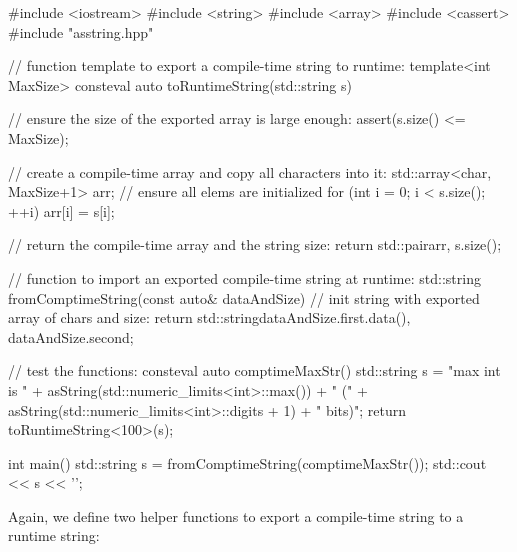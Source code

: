 \begin{cpp}
#include <iostream>
#include <string>
#include <array>
#include <cassert>
#include "asstring.hpp"

// function template to export a compile-time string to runtime:
template<int MaxSize>
consteval auto toRuntimeString(std::string s)
{
	// ensure the size of the exported array is large enough:
	assert(s.size() <= MaxSize);
	
	// create a compile-time array and copy all characters into it:
	std::array<char, MaxSize+1> arr{}; // ensure all elems are initialized
	for (int i = 0; i < s.size(); ++i) {
		arr[i] = s[i];
	}
	
	// return the compile-time array and the string size:
	return std::pair{arr, s.size()};
}

// function to import an exported compile-time string at runtime:
std::string fromComptimeString(const auto& dataAndSize)
{
	// init string with exported array of chars and size:
	return std::string{dataAndSize.first.data(),
					   dataAndSize.second};
}

// test the functions:
consteval auto comptimeMaxStr()
{
	std::string s = "max int is " + asString(std::numeric_limits<int>::max())
					+ " (" + asString(std::numeric_limits<int>::digits + 1)
					+ " bits)";
	return toRuntimeString<100>(s);
}

int main()
{
	std::string s = fromComptimeString(comptimeMaxStr());
	std::cout << s << '\n';
}
\end{cpp}

Again, we define two helper functions to export a compile-time string to a runtime string:

